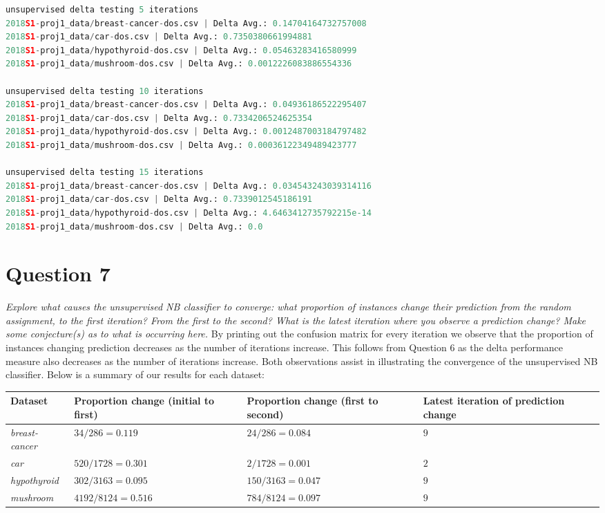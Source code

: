 \documentclass[a4paper]{article}
\begin{document}
\begin{lstlisting}[language=Python]
unsupervised delta testing 5 iterations
2018S1-proj1_data/breast-cancer-dos.csv | Delta Avg.: 0.14704164732757008
2018S1-proj1_data/car-dos.csv | Delta Avg.: 0.7350380661994881
2018S1-proj1_data/hypothyroid-dos.csv | Delta Avg.: 0.05463283416580999
2018S1-proj1_data/mushroom-dos.csv | Delta Avg.: 0.0012226083886554336

unsupervised delta testing 10 iterations
2018S1-proj1_data/breast-cancer-dos.csv | Delta Avg.: 0.04936186522295407
2018S1-proj1_data/car-dos.csv | Delta Avg.: 0.7334206524625354
2018S1-proj1_data/hypothyroid-dos.csv | Delta Avg.: 0.0012487003184797482
2018S1-proj1_data/mushroom-dos.csv | Delta Avg.: 0.00036122349489423777

unsupervised delta testing 15 iterations
2018S1-proj1_data/breast-cancer-dos.csv | Delta Avg.: 0.034543243039314116
2018S1-proj1_data/car-dos.csv | Delta Avg.: 0.7339012545186191
2018S1-proj1_data/hypothyroid-dos.csv | Delta Avg.: 4.6463412735792215e-14
2018S1-proj1_data/mushroom-dos.csv | Delta Avg.: 0.0
\end{lstlisting}
\newpage
\section*{Question 7}
\textit{Explore what causes the unsupervised NB classifier to converge: what proportion of instances change their prediction from the random assignment, to the first iteration? From the first to the second? What is the latest iteration where you observe a prediction change? Make some conjecture(s) as to what is occurring here.}
\newline
\newline
By printing out the confusion matrix for every iteration we observe that the proportion of instances changing prediction decreases as the number of iterations increase. This follows from Question 6 as the delta performance measure also decreases as the number of iterations increase. Both observations assist in illustrating the convergence of the unsupervised NB classifier. Below is a summary of our results for each dataset:

\begin{center}
    \begin{tabular}{ | p{3cm} | p{3cm} | p{3cm} |  p{3cm}|}
    \hline
    Dataset & Proportion change (initial to first) & Proportion change
(first to second)
 & Latest iteration of prediction change \\ \hline
    \textit{breast-cancer} & $34/286 = 0.119$ & $24/286 = 0.084$ & $9$ \\ \hline
    \textit{car} & $520/1728 = 0.301$ & $2/1728 = 0.001$ & $2$ \\ \hline
    \textit{hypothyroid} & $302/3163 = 0.095$ & $150/3163 = 0.047$ & $9$ \\ \hline
    \textit{mushroom} & $4192/8124 = 0.516$ & $784/8124 = 0.097$ & $9$\\
    \hline
    \end{tabular}
\end{center}
\end{document}
